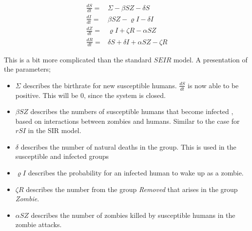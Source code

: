 \documentclass[%
twoside,                 %
final,                   %
chapterprefix=true,      %
open=right               %
10pt]{book}
\begin{document}
\begin{align*}
\frac{dS}{dt} =& \Sigma -\beta SZ - \delta S \\
\frac{dI}{dt} =& \beta SZ - \varrho I - \delta I\\
\frac{dZ}{dt} =& \varrho I + \zeta R - \alpha SZ\\
\frac{dR}{dt} =& \delta S + \delta I + \alpha SZ - \zeta R
\end{align*}

This is a bit more complicated than the standard $SEIR$ model. A presentation of the parameters;
\begin{itemize}
\item $\Sigma$ describes the birthrate for new susceptible humans. $\frac{dS}{dt}$ is now able to be positive. This will be 0, since the system is closed. 

\item $\beta SZ$ describes the numbers of susceptible humans that become infected , based on interactions between zombies and humans. Similar to the case for $rSI$ in the SIR model. 

\item $\delta$ describes the number of natural deaths in the group. This is used in the susceptible and infected groups

\item $\varrho I$ describes the probability for an infected human to wake up as a zombie.

\item $\zeta R$ describes the number from the group \emph{Removed} that arises in the group \emph{Zombie}. 

\item $\alpha SZ$ describes the number of zombies killed by susceptible humans in the zombie attacks. 
\end{itemize}

\noindent


\vspace{3mm}




\vspace{3mm}
\end{document}
